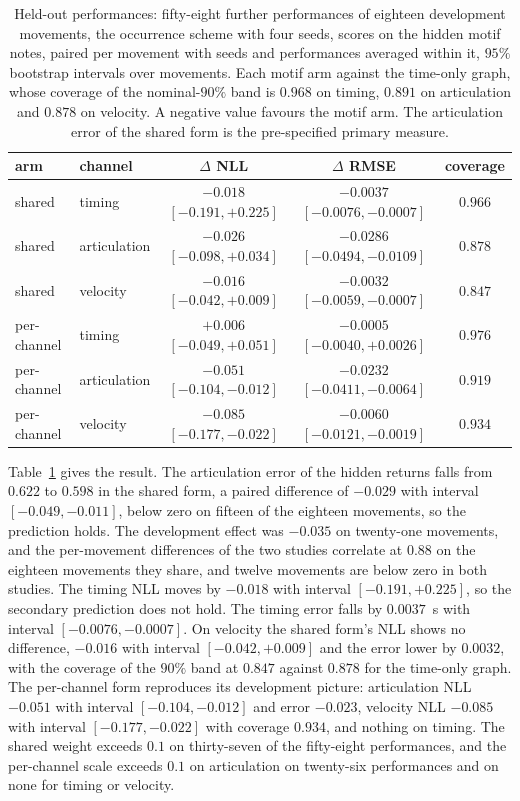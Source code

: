 \documentclass[11pt,a4paper]{report}
\begin{document}
\begin{table}[t]\centering
\caption{Held-out performances: fifty-eight further performances of
eighteen development movements, the occurrence scheme with four seeds, scores on the hidden motif notes, paired
per movement with seeds and performances averaged within it, $95\%$
bootstrap intervals over movements. Each motif arm against the time-only
graph, whose coverage of the nominal-$90\%$ band is $0.968$ on timing,
$0.891$ on articulation and $0.878$ on velocity. A negative value favours
the motif arm. The articulation error of the shared form is the
pre-specified primary measure.}
\label{tab:motif-heldout}
\footnotesize
\begin{tabular}{@{}llccc@{}}
\toprule
arm & channel & $\Delta$ NLL & $\Delta$ RMSE & coverage \\
\midrule
shared & timing & $-0.018$ $[-0.191, +0.225]$ & $-0.0037$ $[-0.0076, -0.0007]$ & $0.966$ \\
shared & articulation & $-0.026$ $[-0.098, +0.034]$ & $-0.0286$ $[-0.0494, -0.0109]$ & $0.878$ \\
shared & velocity & $-0.016$ $[-0.042, +0.009]$ & $-0.0032$ $[-0.0059, -0.0007]$ & $0.847$ \\
per-channel & timing & $+0.006$ $[-0.049, +0.051]$ & $-0.0005$ $[-0.0040, +0.0026]$ & $0.976$ \\
per-channel & articulation & $-0.051$ $[-0.104, -0.012]$ & $-0.0232$ $[-0.0411, -0.0064]$ & $0.919$ \\
per-channel & velocity & $-0.085$ $[-0.177, -0.022]$ & $-0.0060$ $[-0.0121, -0.0019]$ & $0.934$ \\
\bottomrule
\end{tabular}
\end{table}

Table~\ref{tab:motif-heldout} gives the result. The articulation error of
the hidden returns falls from $0.622$ to $0.598$ in the shared form, a
paired difference of $-0.029$ with interval $[-0.049, -0.011]$, below zero
on fifteen of the eighteen movements, so the prediction holds. The
development effect was $-0.035$ on twenty-one movements, and the
per-movement differences of the two studies correlate at $0.88$ on the
eighteen movements they share, and twelve movements are below zero in
both studies. The timing NLL moves by $-0.018$ with interval
$[-0.191, +0.225]$, so the secondary prediction does not hold. The timing
error
falls by $0.0037$~s with interval $[-0.0076, -0.0007]$. On velocity the
shared form's NLL shows no difference,
$-0.016$ with interval $[-0.042, +0.009]$ and the error lower by $0.0032$,
with the coverage of the $90\%$ band at $0.847$ against $0.878$ for the
time-only graph. The per-channel form reproduces its development picture:
articulation NLL $-0.051$ with interval $[-0.104, -0.012]$ and error
$-0.023$, velocity NLL $-0.085$ with interval $[-0.177, -0.022]$ with
coverage $0.934$, and nothing on timing. The shared weight exceeds $0.1$ on thirty-seven of the fifty-eight
performances, and the per-channel scale exceeds $0.1$ on articulation on
twenty-six performances and on none for timing or velocity.
\end{document}
